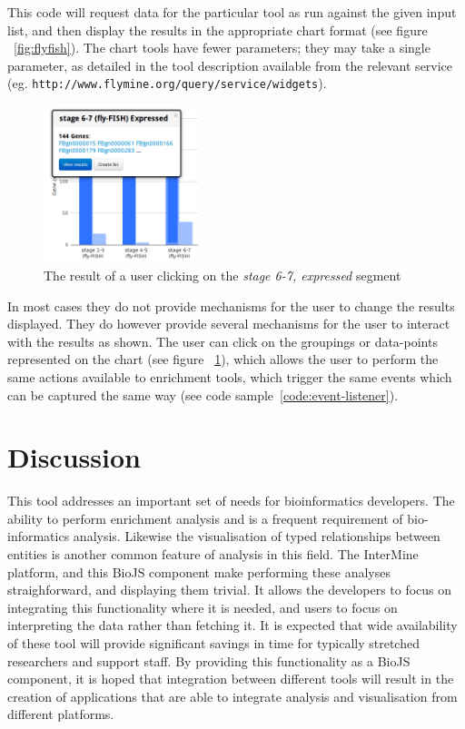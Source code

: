 \documentclass[10pt,a4paper,twocolumn]{article}
\begin{document}
This code will request data for the particular tool as run against the given input list, and then
display the results in the appropriate chart format (see figure ~\ref{fig:flyfish}). The chart
tools have fewer parameters; they may take a single parameter, as detailed in the tool description
available from the relevant service (eg. \texttt{http://www.flymine.org/query/service/widgets}).

\begin{figure}
\centering
\includegraphics[width=0.4\textwidth]{im-widgets-flyfish-selected.png}
\caption{\label{fig:click-chart}The result of a user clicking on the
\emph{stage 6-7, expressed} segment}
\end{figure}

In most cases they do not provide mechanisms for the user to change the results displayed. They do
however provide several mechanisms for the user to interact with the results as shown. The user can
click on the groupings or data-points represented on the chart (see figure ~\ref{fig:click-chart}),
which allows the user to perform the same actions available to enrichment tools, which trigger the
same events which can be captured the same way (see code sample~\ref{code:event-listener}).

\section*{Discussion}

This tool addresses an important set of needs for bioinformatics developers. The ability to
perform enrichment analysis and is a frequent requirement of bio-informatics analysis. Likewise
the visualisation of typed relationships between entities is another common feature of analysis
in this field. The InterMine platform, and this BioJS component make performing these analyses
straighforward, and displaying them trivial. It allows the developers to focus on integrating
this functionality where it is needed, and users to focus on interpreting the data rather than
fetching it. It is expected that wide availability of these tool will provide significant savings
in time for typically stretched researchers and support staff. By providing this functionality
as a BioJS component, it is hoped that integration between different tools will result in the
creation of applications that are able to integrate analysis and visualisation from different
platforms.
\end{document}
